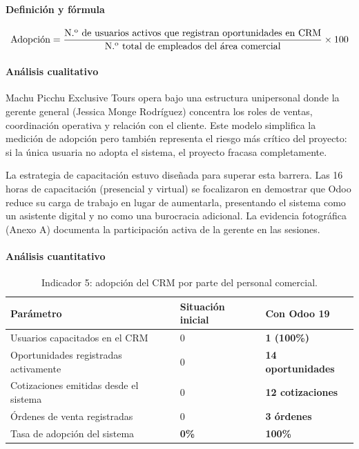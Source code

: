 \paragraph{Definición y fórmula}
\[
\text{Adopci\'{o}n} = \frac{\text{N.\textsuperscript{o} de usuarios activos que registran oportunidades en CRM}}{\text{N.\textsuperscript{o} total de empleados del \'{a}rea comercial}} \times 100
\]

\paragraph{Análisis cualitativo}
Machu Picchu Exclusive Tours opera bajo una estructura unipersonal donde la gerente general (Jessica Monge Rodríguez) concentra los roles de ventas, coordinación operativa y relación con el cliente. Este modelo simplifica la medición de adopción pero también representa el riesgo más crítico del proyecto: si la única usuaria no adopta el sistema, el proyecto fracasa completamente.

La estrategia de capacitación estuvo diseñada para superar esta barrera. Las 16 horas de capacitación (presencial y virtual) se focalizaron en demostrar que Odoo reduce su carga de trabajo en lugar de aumentarla, presentando el sistema como un asistente digital y no como una burocracia adicional. La evidencia fotográfica (Anexo A) documenta la participación activa de la gerente en las sesiones.

\paragraph{Análisis cuantitativo}
\begin{table}[htbp]
\centering
\renewcommand{\arraystretch}{1.3}
\begin{tabular}{|p{5.5cm}|p{2.5cm}|p{2.5cm}|}
\hline
\textbf{Parámetro} & \textbf{Situación inicial} & \textbf{Con Odoo 19} \\ \hline
Usuarios capacitados en el CRM & 0 & \textbf{1 (100\%)} \\ \hline
Oportunidades registradas activamente & 0 & \textbf{14 oportunidades} \\ \hline
Cotizaciones emitidas desde el sistema & 0 & \textbf{12 cotizaciones} \\ \hline
Órdenes de venta registradas & 0 & \textbf{3 órdenes} \\ \hline
Tasa de adopción del sistema & \textbf{0\%} & \textbf{100\%} \\ \hline
\end{tabular}
\caption{Indicador 5: adopción del CRM por parte del personal comercial.}
\end{table}

